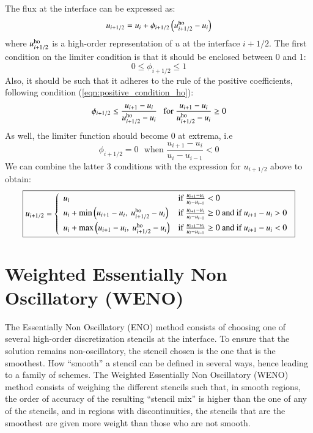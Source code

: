 \documentclass{warpdoc}
\newcommand{\alb}{\vspace{0.1cm}\\} %
\newcommand\frameeqn[1]{\fbox{$\displaystyle #1$}}
\begin{document}
The flux at the interface can be expressed as:
%
\begin{equation}
u_{i+1/2} = u_i +  \phi_{i+1/2} \left( u_{i+1/2}^{\rm ho} - u_i \right)
\end{equation}
% 
where $u_{i+1/2}^{\rm ho}$ is a high-order representation of $u$ at the interface $i+1/2$. 
The first condition on the limiter condition is that it should be enclosed between 0 and 1:
%
\begin{equation}
  0 \le \phi_{i+1/2} \le 1
\end{equation}
%
Also, it should be such that it adheres to the rule of the positive coefficients, following condition (\ref{eqn:positive_condition_ho}):
%
\begin{equation}
 \phi_{i+1/2} \le \frac{u_{i+1} - u_{i}}{u_{i+1/2}^{\rm ho} - u_{i}} ~~~{\rm for~}\frac{u_{i+1} - u_{i}}{u_{i+1/2}^{\rm ho} - u_{i}}\ge 0
\end{equation}
%
As well, the limiter function should become 0 at extrema, i.e
%
\begin{equation}
\phi_{i+1/2}=0 ~~~\textrm{when~}\frac{u_{i+1}-u_i}{u_i-u_{i-1}}<0
\end{equation}
%
We can combine the latter 3 conditions with the expression for $u_{i+1/2}$ above to obtain:
%
\begin{equation}
\frameeqn{
 u_{i+1/2}=\left\{ 
\begin{array}{ll} 
u_i & \textrm{if~}\frac{u_{i+1}-u_i}{u_i-u_{i-1}}<0\alb
u_i+\min\left(u_{i+1}-u_i,~u_{i+1/2}^{\rm ho}-u_i\right) & \textrm{if~}\frac{u_{i+1}-u_i}{u_i-u_{i-1}}\ge 0\textrm{~and~if~}u_{i+1}-u_i>0\alb
u_i+\max\left(u_{i+1}-u_i,~u_{i+1/2}^{\rm ho}-u_i\right) & \textrm{if~}\frac{u_{i+1}-u_i}{u_i-u_{i-1}}\ge 0\textrm{~and~if~}u_{i+1}-u_i<0\\
\end{array}\right.
}
\end{equation}
%














\section{Weighted Essentially Non Oscillatory (WENO)}

The Essentially Non Oscillatory (ENO) method \cite{jcp:1987:harten} consists of choosing one of several high-order discretization stencils at the interface. To ensure that the solution remains non-oscillatory, the stencil chosen is the one that is the smoothest. How ``smooth'' a stencil can be defined in several ways, hence leading to a family of schemes. The Weighted Essentially Non Oscillatory (WENO) method \cite{jcp:1994:liu} consists of weighing the different stencils such that, in smooth regions, the order of accuracy of the resulting ``stencil mix'' is higher than the one of any of the stencils,  and in regions with discontinuities, the stencils that are the smoothest are given more weight than those who are not smooth.
\end{document}

